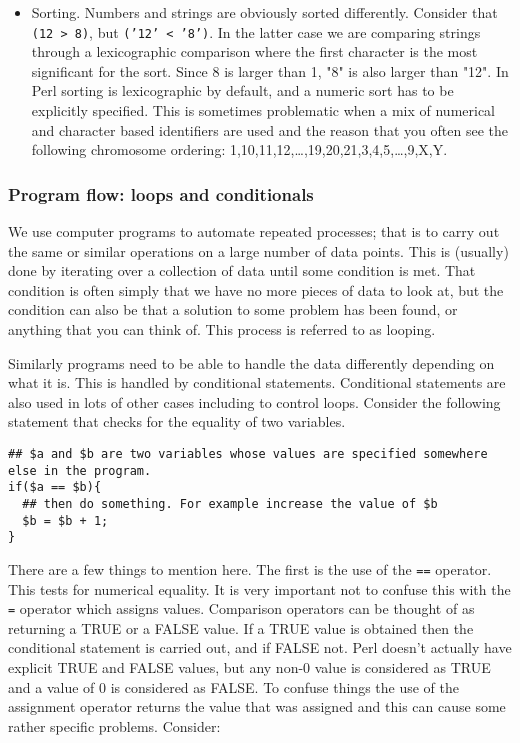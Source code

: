 \documentclass[11pt]{article}
\begin{document}
\begin{itemize}
\item Sorting. Numbers and strings are obviously sorted
differently. Consider that \texttt{(12 > 8)}, but \texttt{('12' < '8')}. In the latter
case we are comparing strings through a lexicographic comparison
where the first character is the most significant for the
sort. Since 8 is larger than 1, "8" is also larger than "12". In
Perl sorting is lexicographic by default, and a numeric sort has to
be explicitly specified. This is sometimes problematic when a mix of
numerical and character based identifiers are used and the reason
that you often see the following chromosome ordering:
1,10,11,12,\ldots{},19,20,21,3,4,5,\ldots{},9,X,Y.
\end{itemize}

\subsubsection{Program flow: loops and conditionals}
\label{sec-5-0-4}

We use computer programs to automate repeated processes; that is to
carry out the same or similar operations on a large number of data
points. This is (usually) done by iterating over a collection of data
until some condition is met. That condition is often simply that we have
no more pieces of data to look at, but the condition can also be that a
solution to some problem has been found, or anything that you can think
of. This process is referred to as looping.

Similarly programs need to be able to handle the data differently
depending on what it is. This is handled by conditional statements.
Conditional statements are also used in lots of other cases including to
control loops. Consider the following statement that checks for the
equality of two variables.

\begin{verbatim}
## $a and $b are two variables whose values are specified somewhere else in the program.
if($a == $b){
  ## then do something. For example increase the value of $b
  $b = $b + 1;
}
\end{verbatim}

There are a few things to mention here. The first is the use of the \texttt{==}
operator. This tests for numerical equality. It is very important not to
confuse this with the \texttt{=} operator which assigns values. Comparison
operators can be thought of as returning a TRUE or a FALSE value. If a
TRUE value is obtained then the conditional statement is carried out,
and if FALSE not. Perl doesn't actually have explicit TRUE and FALSE
values, but any non-0 value is considered as TRUE and a value of 0 is
considered as FALSE. To confuse things the use of the assignment
operator returns the value that was assigned and this can cause some
rather specific problems. Consider:
\end{document}
